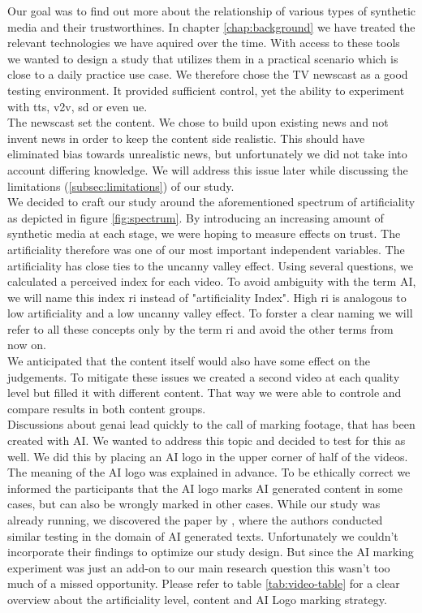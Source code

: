 \documentclass[
  a4paper,  %
  twoside,  %
  bibliography=totoc,
  headsepline,
  cleardoublepage=empty,
  parskip=half,
  draft=false
]{scrbook}
\begin{document}
Our goal was to find out more about the relationship of various types of synthetic media and their trustworthines. In chapter \ref{chap:background} we have treated the relevant technologies we have aquired over the time. With access to these tools we wanted to design a study that utilizes them in a practical scenario which is close to a daily practice use case. We therefore chose the TV newscast as a good testing environment. It provided sufficient control, yet the ability to experiment with \gls{tts}, \gls{v2v}, \gls{sd} or even \gls{ue}. \\
The newscast set the content. We chose to build upon existing news and not invent news in order to keep the content side realistic. This should have eliminated bias towards unrealistic news, but unfortunately we did not take into account differing knowledge. We will address this issue later while discussing the limitations (\ref{subsec:limitations}) of our study. \\
We decided to craft our study around the aforementioned spectrum of artificiality as depicted in figure \ref{fig:spectrum}. By introducing an increasing amount of synthetic media at each stage, we were hoping to measure effects on trust. The artificiality therefore was one of our most important independent variables. The artificiality has close ties to the uncanny valley effect. Using several questions, we calculated a perceived index for each video. To avoid ambiguity with the term AI, we will name this index \gls{ri} instead of "artificiality Index". High \gls{ri} is analogous to low artificiality and a low uncanny valley effect. To forster a clear naming we will refer to all these concepts only by the term \gls{ri} and avoid the other terms from now on.\\
We anticipated that the content itself would also have some effect on the judgements. To mitigate these issues we created a second video at each quality level but filled it with different content. That way we were able to controle and compare results in both content groups. \\
Discussions about \gls{genai} lead quickly to the call of marking footage, that has been created with AI. We wanted to address this topic and decided to test for this as well. We did this by placing an AI logo in the upper corner of half of the videos. The meaning of the AI logo was explained in advance. To be ethically correct we informed the participants that the AI logo marks AI generated content in some cases, but can also be wrongly marked in other cases. While our study was already running, we discovered the paper by \citeauthor{toffTheyCouldJust2023}, where the authors conducted similar testing in the domain of AI generated texts. Unfortunately we couldn't incorporate their findings to optimize our study design. But since the AI marking experiment was just an add-on to our main research question this wasn't too much of a missed opportunity. Please refer to table \ref{tab:video-table} for a clear overview about the artificiality level, content and AI Logo marking strategy.
\end{document}
